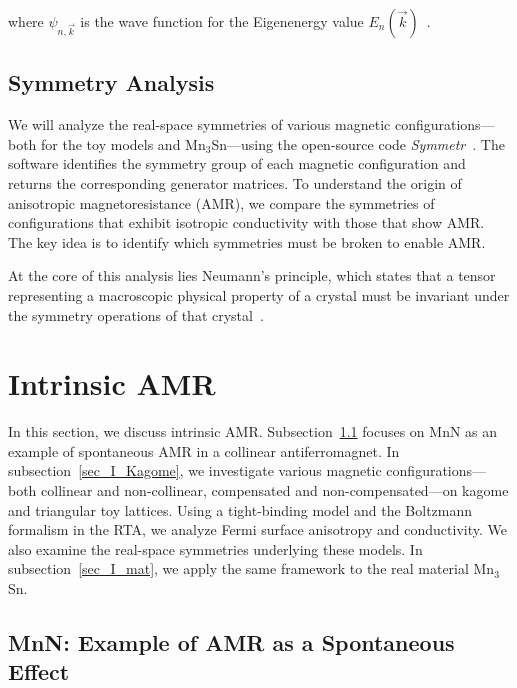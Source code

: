 \documentclass[prb,showpacs,amsmath,amssymb,superscriptaddress,twocolumn,floatfix]{revtex4-1}
\begin{document}
where $\psi_{n, \vec{k}}$ is the wave function for the Eigenenergy value $E_n(\vec{k})$~\cite{Vyborny:2009}. 


\subsection{Symmetry Analysis}
We will analyze the real-space symmetries of various magnetic configurations—both for the toy models and Mn$_3$Sn—using the open-source code \textit{Symmetr}~\cite{Symmetr}. The software identifies the symmetry group of each magnetic configuration and returns the corresponding generator matrices. To understand the origin of anisotropic magnetoresistance (AMR), we compare the symmetries of configurations that exhibit isotropic conductivity with those that show AMR. The key idea is to identify which symmetries must be broken to enable AMR.

At the core of this analysis lies Neumann’s principle, which states that a tensor representing a macroscopic physical property of a crystal must be invariant under the symmetry operations of that crystal~\cite{Ritzinger:2021}.


\section{Intrinsic AMR}
\label{sec_intrinsic}

In this section, we discuss intrinsic AMR. Subsection~\ref{sec_I_MnN} focuses on MnN as an example of spontaneous AMR in a collinear antiferromagnet. In subsection~\ref{sec_I_Kagome}, we investigate various magnetic configurations—both collinear and non-collinear, compensated and non-compensated—on kagome and triangular toy lattices. Using a tight-binding model and the Boltzmann formalism in the RTA, we analyze Fermi surface anisotropy and conductivity. We also examine the real-space symmetries underlying these models. In subsection~\ref{sec_I_mat}, we apply the same framework to the real material Mn$_3$Sn. 

\subsection{MnN: Example of AMR as a Spontaneous Effect}
\label{sec_I_MnN}
\end{document}
